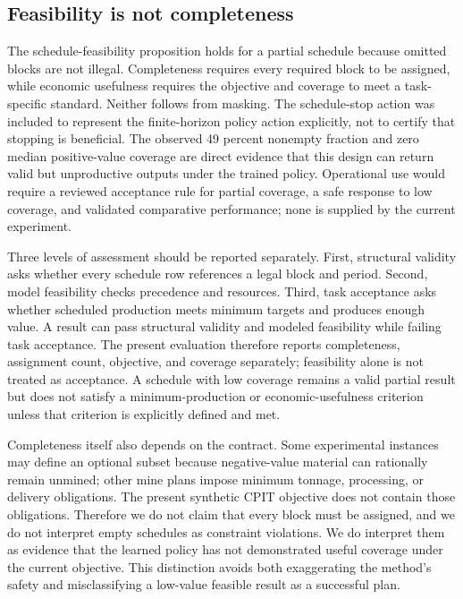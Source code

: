 \documentclass[11pt]{article}
\begin{document}
\subsection{Feasibility is not completeness}
The schedule-feasibility proposition holds for a partial schedule because omitted blocks are not illegal. Completeness requires every required block to be assigned, while economic usefulness requires the objective and coverage to meet a task-specific standard. Neither follows from masking. The schedule-stop action was included to represent the finite-horizon policy action explicitly, not to certify that stopping is beneficial. The observed 49 percent nonempty fraction and zero median positive-value coverage are direct evidence that this design can return valid but unproductive outputs under the trained policy. Operational use would require a reviewed acceptance rule for partial coverage, a safe response to low coverage, and validated comparative performance; none is supplied by the current experiment.

Three levels of assessment should be reported separately. First, structural validity asks whether every schedule row references a legal block and period. Second, model feasibility checks precedence and resources. Third, task acceptance asks whether scheduled production meets minimum targets and produces enough value. A result can pass structural validity and modeled feasibility while failing task acceptance. The present evaluation therefore reports completeness, assignment count, objective, and coverage separately; feasibility alone is not treated as acceptance. A schedule with low coverage remains a valid partial result but does not satisfy a minimum-production or economic-usefulness criterion unless that criterion is explicitly defined and met.

Completeness itself also depends on the contract. Some experimental instances may define an optional subset because negative-value material can rationally remain unmined; other mine plans impose minimum tonnage, processing, or delivery obligations. The present synthetic CPIT objective does not contain those obligations. Therefore we do not claim that every block must be assigned, and we do not interpret empty schedules as constraint violations. We do interpret them as evidence that the learned policy has not demonstrated useful coverage under the current objective. This distinction avoids both exaggerating the method's safety and misclassifying a low-value feasible result as a successful plan.
\end{document}
